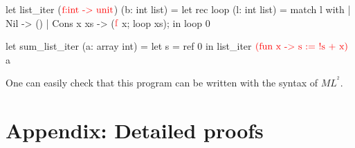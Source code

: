 \documentclass[a4paper,11pt,oneside]{article}
\theoremstyle{plain}
\newcommand{\inlsrc}{\textit{ML}^{^2}}
\begin{document}
\begin{small}
	\begin{minipage}[t]{0.4\linewidth}	
	\begin{whycode}  
let list_iter ($\textcolor{red}{\text{f:int -> unit}}$) (b: int list)   
 = let rec loop (l: int list) = 
      match l with 
       | Nil       -> ()
       | Cons x xs -> ($\textcolor{red}{\text{f}}$ x; loop xs); 
   in loop 0 
   
   let sum_list_iter (a: array int) =		 
     let s = ref 0 in
     list_iter $\textcolor{red}{\text{(fun x -> s := !s + x)}}$ a     
 	\end{whycode}
 	\end{minipage}
 \end{small}	

One can easily check that this program can be written with the syntax of $\inlsrc$.


 	





\appendix
\newpage
\section{Appendix: Detailed proofs} 

\end{document}

